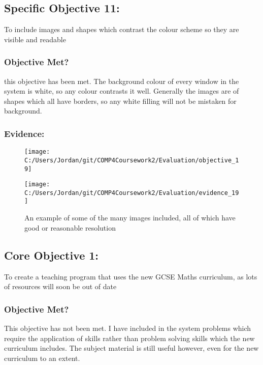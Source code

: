 \subsection{Specific Objective 11: }

To include images and shapes which contrast the colour scheme so they are visible and readable

\subsubsection{Objective Met?}

this objective has been met. The background colour of every window in the system is white, so any colour contrasts it well. Generally the images are of shapes which all have borders, so any white filling will not be mistaken for background.

\subsubsection{Evidence: }

\begin{figure}[H]
	\texttt{[image: C:/Users/Jordan/git/COMP4Coursework2/Evaluation/objective\_19]}
\end{figure}

\begin{figure}[H]
	\texttt{[image: C:/Users/Jordan/git/COMP4Coursework2/Evaluation/evidence\_19]}
	\caption{An example of some of the many images included, all of which have good or reasonable resolution}
\end{figure}

\subsection{Core Objective 1: }

To create a teaching program that uses the new GCSE Maths curriculum, as lots of resources will soon be out of date

\subsubsection{Objective Met?}

This objective has not been met. I have included in the system problems which require the application of skills rather than problem solving skills which the new curriculum includes. The subject material is still useful however, even for the new curriculum to an extent.

